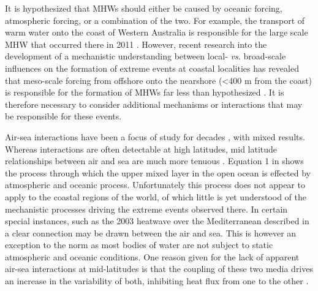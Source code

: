 \documentclass[a4paper,10pt,review]{elsarticle}
\begin{document}
It is hypothesized that MHWs should either be caused by oceanic forcing, atmospheric forcing, or a combination of the two. For example, the transport of warm water onto the coast of Western Australia is responsible for the large scale MHW that occurred there in 2011 \citep{Feng2013, Benthuysen2014}. However, recent research into the development of a mechanistic understanding between local- \emph{vs.} broad-scale influences on the formation of extreme events at coastal localities has revealed that meso-scale forcing from offshore onto the nearshore (<400 m from the coast) is responsible for the formation of MHWs far less than hypothesized \citep{Schlegel2016}. It is therefore necessary to consider additional mechanisms or interactions that may be responsible for these events. 

Air-sea interactions have been a focus of study for decades \citep{Frankignoul1985}, with mixed results. Whereas interactions are often detectable at high latitudes, mid latitude relationships between air and sea are much more tenuous \citep{Krishnamurti1988}. Equation 1 in \citet{Deser2010} shows the process through which the upper mixed layer in the open ocean is effected by atmospheric and oceanic process. Unfortunately this process does not appear to apply to the coastal regions of the world, of which little is yet understood of the mechanistic processes driving the extreme events observed there. In certain special instances, such as the 2003 heatwave over the Mediterranean described in \citet{Garrabou2009} a clear connection may be drawn between the air and sea. This is however an exception to the norm as most bodies of water are not subject to static atmospheric and oceanic conditions. One reason given for the lack of apparent air-sea interactions at mid-latitudes is that the coupling of these two media drives an increase in the variability of both, inhibiting heat flux from one to the other \citep{Barsugli1998}.
\end{document}
